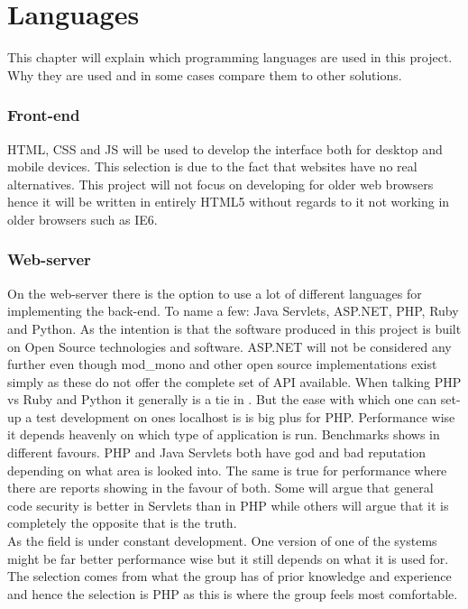 \chapter{Languages}
\label{chp:languages}
This chapter will explain which programming languages are used in this project. Why they are used and in some cases compare them to other solutions.\\
\subsection*{Front-end}
\label{sec:frontend} %
HTML, CSS and JS will be used to develop the interface both for desktop and mobile devices. This selection is due to the fact that websites have no real alternatives. This project will not focus on developing for older web browsers hence it will be written in entirely HTML5 without regards to it not working in older browsers such as IE6.

\subsection*{Web-server}
\label{sec:webserver} %
On the web-server there is the option to use a lot of different languages for implementing the back-end. To name a few: Java Servlets, ASP.NET, PHP, Ruby and Python. As the intention is that the software produced in this project is built on Open Source technologies and software. ASP.NET will not be considered any further even though mod_mono and other open source implementations exist simply as these do not offer the complete set of API available. When talking PHP vs Ruby and Python it generally is a tie in . But the ease with which one can set-up a test development on ones localhost is is big plus for PHP. Performance wise it depends heavenly on which type of application is run. Benchmarks shows in different favours. PHP and Java Servlets both have god and bad reputation depending on what area is looked into. The same is true for performance where there are reports showing in the favour of both. Some will argue that general code security is better in Servlets than in PHP while others will argue that it is completely the opposite that is the truth. \\
As the field is under constant development. One version of one of the systems might be far better performance wise but it still depends on what it is used for. The selection comes from what the group has of prior knowledge and experience and hence the selection is PHP as this is where the group feels most comfortable.


